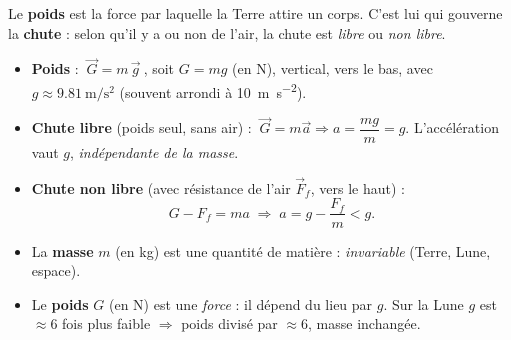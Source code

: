 \documentclass[11pt,a4paper]{article}
\newcommand{\vv}[1]{\vec{#1}}\newcommand{\ds}{\displaystyle}
\begin{document}

\noindent Le \textbf{poids} est la force par laquelle la Terre attire un corps. C'est lui qui gouverne
la \textbf{chute} : selon qu'il y a ou non de l'air, la chute est \emph{libre} ou \emph{non libre}.

\begin{cle}
\begin{itemize}[leftmargin=1.5em,itemsep=3pt]
  \item \textbf{Poids} : $\ \vv G=m\,\vv g\ $, soit $G=mg$ (en \si{\newton}), vertical, vers le bas,
        avec $g\approx\qty{9,81}{\metre\per\second\squared}$ (souvent arrondi à \qty{10}{\metre\per\second\squared}).
  \item \textbf{Chute libre} (poids seul, sans air) : $\ \vv G=m\vv a \Rightarrow a=\dfrac{mg}{m}=g$.
        L'accélération vaut $g$, \emph{indépendante de la masse}.
  \item \textbf{Chute non libre} (avec résistance de l'air $\vv F_f$, vers le haut) :
        \[ G-F_f=ma \;\Longrightarrow\; a=g-\frac{F_f}{m}<g. \]
\end{itemize}
\end{cle}

\begin{center}
\end{center}

\begin{methode}
\begin{itemize}[leftmargin=1.5em,topsep=2pt,itemsep=1.5pt]
  \item La \textbf{masse} $m$ (en \si{\kilogram}) est une quantité de matière : \emph{invariable} (Terre, Lune, espace).
  \item Le \textbf{poids} $G$ (en \si{\newton}) est une \emph{force} : il dépend du lieu par $g$.
        Sur la Lune $g$ est $\approx 6$ fois plus faible $\Rightarrow$ poids divisé par $\approx 6$, masse inchangée.
\end{itemize}
\end{methode}
\end{document}
